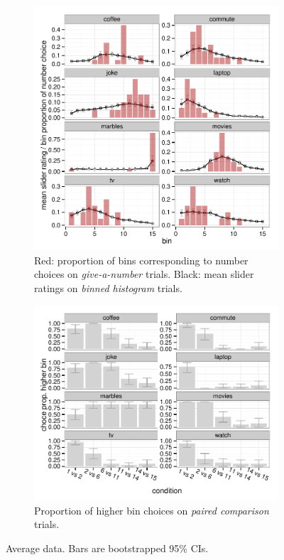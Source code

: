 \documentclass[10pt,letterpaper]{article}
\begin{document}
\begin{figure}[t!]
  \centering
  \begin{subfigure}{0.475\textwidth}
    \includegraphics[width = \textwidth]{plots/data_sliderNumber.pdf}
    \caption{Red: proportion of bins corresponding to number choices on \emph{give-a-number} trials. Black: mean slider ratings on \emph{binned histogram} trials.}
    \label{fig:slider}
  \end{subfigure}

  \begin{subfigure}{0.475\textwidth}
    \includegraphics[width = \textwidth]{plots/data_choice.pdf}
    \caption{Proportion of higher bin choices on \emph{paired comparison} trials.}
    \label{fig:lighting}
  \end{subfigure}

  \caption{Average data. Bars are bootstrapped 95\% CIs.}
  \label{fig:Results}
\end{figure}
\end{document}
